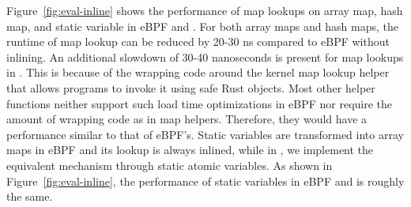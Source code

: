 Figure~\ref{fig:eval-inline} shows the performance of map lookups on array map,
    hash map, and static variable in eBPF and \projname{}.
For both array maps and hash maps, the
    runtime of map lookup can be reduced by 20-30 ns compared to eBPF without
    inlining.
An additional slowdown of 30-40 nanoseconds is present for map lookups in
    \projname{}.
This is because of the wrapping code around the kernel
    map lookup helper that allows \projname{} programs to invoke
    it using safe Rust objects.
Most other helper functions neither support such load time
    optimizations in eBPF nor require the amount of wrapping code as in
    map helpers.
Therefore, they would have a performance similar to that of eBPF's.
Static variables are transformed into array maps in eBPF and its lookup is
    always inlined, while in \projname{}, we implement the equivalent mechanism
    through static atomic variables.
As shown in Figure~\ref{fig:eval-inline}, the performance of static variables
    in eBPF and \projname{} is roughly the same.



